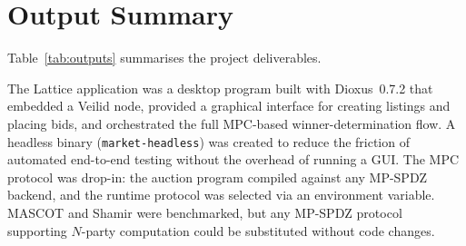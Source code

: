 
\section{Output Summary}
\label{sec:output-summary}

Table~\ref{tab:outputs} summarises the project deliverables.

\begin{table}[H]
\centering
\small
\renewcommand{\arraystretch}{1.3}
%
\caption{Project deliverables.}
\label{tab:outputs}
\end{table}

The Lattice application was a desktop program built with Dioxus~0.7.2 that
embedded a Veilid node, provided a graphical interface for creating listings
and placing bids, and orchestrated the full MPC-based winner-determination
flow.  A headless binary (\texttt{market-headless}) was created to reduce the
friction of automated end-to-end testing without the overhead of running a GUI. 
The MPC protocol was drop-in: the auction
program compiled against any MP-SPDZ backend, and the runtime protocol was
selected via an environment variable.  MASCOT and Shamir were benchmarked,
but any MP-SPDZ protocol supporting $N$-party computation could be substituted
without code changes.

